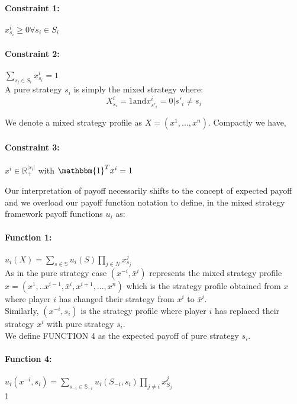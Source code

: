 \documentclass[12pt]{article}
\begin{document}
\paragraph{Constraint 1:} $x^i_{s_i} \geq 0 \forall s_i \in S_i$

\paragraph{Constraint 2:} $\sum\limits_{s_i \in S_i} x^i_{s_i} = 1$\\

A pure strategy $s_i$ is simply the mixed strategy where:
\begin{equation*}
	X^i_{s_i} = 1 \text{and} x^i_{s'_i} = 0 | s'_i \neq s_i
\end{equation*}

We denote a mixed strategy profile as $X = (x^1, ... , x^n)$. Compactly we have,

\paragraph{Constraint 3:}  $x^i \in \mathbb{R}^{|s_i|}_+$ with $\mathbbm{1}^T x^i = 1$

Our interpretation of payoff necessarily shifts to the concept of expected payoff and we overload our payoff function notation to define, in the mixed strategy framework payoff functions $u_i$ as:

\paragraph{Function 1:} $u_i(X) = \sum\limits_{s \in \mathbb{S}} u_i(S)\prod\limits_{j \in N} x^j_{s_j}$\\

As in the pure strategy case $(x^{-i}, \bar{x}^i)$ represents the mixed strategy profile $x = (x^1, .. x^{i-1}, \bar{x}^i, x^{i+1}, ... ,x^n)$ which is the strategy profile obtained from $x$ where player $i$ has changed their strategy from $x^i$ to $\bar{x}^i$.\\

Similarly, $(x^{-i}, s_i)$ is the strategy profile where player $i$ has replaced their strategy $x^i$ with pure strategy $s_i$.\\

We define FUNCTION 4 as the expected payoff of pure strategy $s_i$.

\paragraph{Function 4:} $u_i(x^{-i},s_i) = \sum\limits_{s_{-i} \in \mathbb{S}_{-i}} u_i(S_{-i}, s_i) \prod\limits_{j \neq i} x^j_{S_j}$\\1
\end{document}
